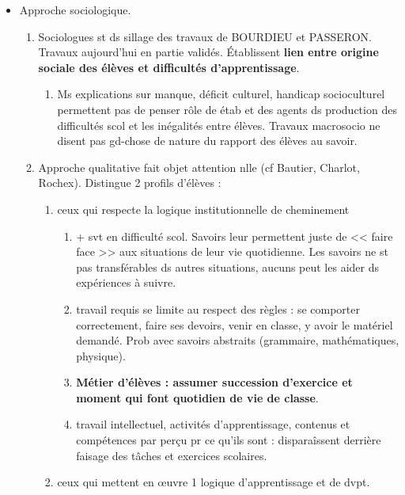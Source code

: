 \documentclass[12pt]{report}
\begin{document}
\begin{itemize}
\item Approche sociologique.
\begin{enumerate}
\item Sociologues st ds sillage des travaux de BOURDIEU et PASSERON. Travaux aujourd'hui en partie validés. Établissent \textbf{lien entre origine sociale des élèves et difficultés d'apprentissage}. \\
\begin{enumerate}
\item Ms explications sur manque, déficit culturel, handicap socioculturel permettent pas de penser rôle de étab et des agents ds production des difficultés scol et les inégalités entre élèves. Travaux macrosocio ne disent pas gd-chose de nature du rapport des élèves au savoir.\\
\end{enumerate}

\item Approche qualitative fait objet attention nlle (cf Bautier, Charlot, Rochex). Distingue 2 profils d'élèves : 
\begin{enumerate}
\item ceux qui respecte la logique institutionnelle de cheminement \\
 
 \begin{enumerate}
 \item + svt en difficulté scol. Savoirs leur permettent juste de << faire face >> aux situations de leur vie quotidienne. Les savoirs ne st pas transférables ds autres situations, aucuns peut les aider ds expériences à suivre. \\
 \item travail requis se limite au respect des règles : se comporter correctement, faire ses devoirs, venir en classe, y avoir le matériel demandé. Prob avec savoirs abstraits (grammaire, mathématiques, physique). \\
 \item \textbf{Métier d'élèves : assumer succession d'exercice et moment qui font quotidien de vie de classe}. \\
 \item travail intellectuel, activités d'apprentissage, contenus et compétences par perçu pr ce qu'ils sont : disparaîssent derrière faisage des tâches et exercices scolaires.
 \end{enumerate}
 
\item ceux qui mettent en œuvre 1 logique d'apprentissage et de dvpt.


\end{enumerate}
\end{enumerate}
\end{itemize}
\end{document}
